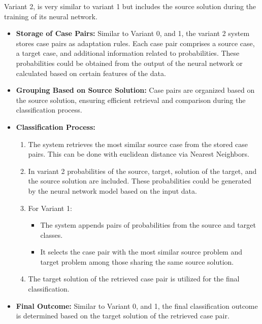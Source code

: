 \documentclass[a4paper, 12pt]{report}
\begin{document}
Variant 2, is very similar to variant 1 but includes the source solution during the training of its neural network.

\begin{itemize}
    \item \textbf{Storage of Case Pairs:} Similar to Variant 0, and 1, the variant 2 system stores case pairs as adaptation rules. 
    Each case pair comprises a source case, a target case, and additional information related to probabilities.
    These probabilities could be obtained from the output of the neural network or calculated based on certain features of the data.
    
    \item \textbf{Grouping Based on Source Solution:} Case pairs are organized based on the source solution, 
    ensuring efficient retrieval and comparison during the classification process.
    
    \item \textbf{Classification Process:} 
    \begin{enumerate}
        \item The system retrieves the most similar source case from the stored case pairs. This can be done with euclidean distance via Nearest Neighbors.
        \item In variant 2 probabilities of the source, target, solution of the target, and the source solution are included.
        These probabilities could be generated by the neural network model based on the input data.
        \item For Variant 1:
            \begin{itemize}
                \item The system appends pairs of probabilities from the source and target classes.
                \item It selects the case pair with the most similar source problem and target problem among those sharing the same source solution.
            \end{itemize}
        \item The target solution of the retrieved case pair is utilized for the final classification.
    \end{enumerate}
    
    \item \textbf{Final Outcome:} Similar to Variant 0, and 1, the final classification outcome is determined based on the target solution of the retrieved case pair.
\end{itemize}
\end{document}
